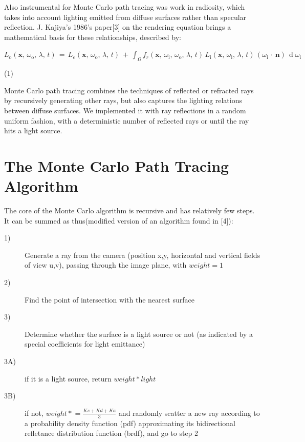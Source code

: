 \documentclass[12pt,journal]{IEEEtran}
\begin{document}
\par

Also instrumental for Monte Carlo path tracing was work in radiosity, which takes into account lighting emitted from diffuse surfaces rather than specular reflection. J. Kajiya's 1986's paper[3] on the rendering equation brings a mathematical basis for these relationships, described by:

\begin{center}
$L_{\text{o}}(\mathbf x,\, \omega_{\text{o}},\, \lambda,\, t) \,=\, L_e(\mathbf x,\, \omega_{\text{o}},\, \lambda,\, t) \ +\, \int_\Omega f_r(\mathbf x,\, \omega_{\text{i}},\, \omega_{\text{o}},\, \lambda,\, t)\, L_{\text{i}}(\mathbf x,\, \omega_{\text{i}},\, \lambda,\, t)\, (\omega_{\text{i}}\,\cdot\,\mathbf n)\, \operatorname d \omega_{\text{i}}$
\end{center}

\begin{flushright}
\par 
(1)
\end{flushright}

\par
Monte Carlo path tracing combines the techniques of reflected or refracted rays by recursively generating other rays, but also captures the lighting relations between diffuse surfaces. We implemented it with ray reflections in a random uniform fashion, with a deterministic number of reflected rays or until the ray hits a light source.

\section{The Monte Carlo Path Tracing Algorithm}
The core of the Monte Carlo algorithm is recursive and has relatively few steps. It can be summed as thus(modified version of an algorithm found in [4]):

\begin{description}
  \item[1)] Generate a ray from the camera (position x,y, horizontal and vertical fields of view u,v), passing through the image plane, with $weight = 1$
  \item[2)] Find the point of intersection with the nearest surface
  \item[3)] Determine whether the surface is a light source or not (as indicated by a special coefficients for light emittance)
  \item[3A)] if it is a light source, return $weight * light$
  \item[3B)] if not, $weight \mathrel{*}= \frac{Ks+Kd+Ka}{3}$ and randomly scatter a new ray according to a probability density function (pdf) approximating its bidirectional refletance distribution function (brdf), and go to step 2
\end{description}
\end{document}
